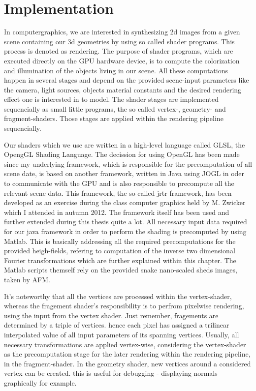 \chapter{Implementation}
In computergraphics, we are interested in synthesizing 2d images from a given scene containing our 3d geometries by using so called shader programs. This process is denoted as rendering.
The purpose of shader programs, which are executed directly on the GPU hardware device, is to compute the colorization and illumination of the objects living in our scene. All these computations happen in several stages and depend on the provided scene-input parameters like the camera, light sources, objects material constants and the desired rendering effect one is interested in to model. The shader stages are implemented sequencially as small little programs, the so called vertex-, geometry- and fragment-shaders. Those stages are applied within the rendering pipeline sequencially. 

Our shaders which we use are written in a high-level language called GLSL, the OpengGL Shading Language. The decission for using OpenGL has been made since my underlying framework, which is responsible for the precomputation of all scene date, is based on another framework, written in Java using JOGL in oder to communicate with the GPU and is also responsible to precompute all the relevant scene data. This framework, the so called jrtr framework, has been developed as an exercise during the class computer graphics held by M. Zwicker which I attended in autumn 2012. The framework itself has been used and further extended during this thesis quite a lot. All necessary input data required for our java framework in order to perform the shading is precomputed by using Matlab. This is basically addressing all the required precomputations for the provided heigh-fields, refering to computation of the inverse two dimensional Fourier transformations which are further explained within this chapter. The Matlab scripts themself rely on the provided snake nano-scaled sheds images, taken by AFM.

It's noteworthy that all the vertices are processed within the vertex-shader, whereas the fragement shader's responsibility is to perfrom pixelwise rendering, using the input from the vertex shader. Just remember, fragements are determined by a triple of vertices. hence each pixel has assigned a trilinear interpolated value of all input parameters of its spanning vertices.
Usually, all necessary transformations are applied vertex-wise, considering the vertex-shader as the precomputation stage for the later rendering within the rendering pipeline, in the fragment-shader. In the geometry shader, new vertices around a considered vertex can be created. this is useful for debugging - displaying normals graphically for example.

